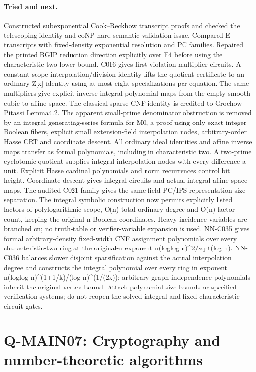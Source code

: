 \paragraph{Tried and next.} Constructed subexponential Cook--Reckhow transcript proofs and checked the telescoping identity and coNP-hard semantic validation issue. Compared E transcripts with fixed-density exponential resolution and PC families. Repaired the printed BGIP reduction direction explicitly over F4 before using the characteristic-two lower bound. C016 gives first-violation multiplier circuits. A constant-scope interpolation/division identity lifts the quotient certificate to an ordinary Z[x] identity using at most eight specializations per equation. The same multipliers give explicit inverse integral polynomial maps from the empty smooth cubic to affine space. The classical sparse-CNF identity is credited to Grochow-Pitassi Lemma4.2. The apparent small-prime denominator obstruction is removed by an integral generating-series formula for M0, a proof using only exact integer Boolean fibers, explicit small extension-field interpolation nodes, arbitrary-order Hasse CRT and coordinate descent. All ordinary ideal identities and affine inverse maps transfer as formal polynomials, including in characteristic two. A two-prime cyclotomic quotient supplies integral interpolation nodes with every difference a unit. Explicit Hasse cardinal polynomials and norm recurrences control bit height. Coordinate descent gives integral circuits and actual integral affine-space maps. The audited C021 family gives the same-field PC/IPS representation-size separation. The integral symbolic construction now permits explicitly listed factors of polylogarithmic scope, O(n) total ordinary degree and O(n) factor count, keeping the original n Boolean coordinates. Heavy incidence variables are branched on; no truth-table or verifier-variable expansion is used. NN-C035 gives formal arbitrary-density fixed-width CNF assignment polynomials over every characteristic-two ring at the original-n exponent n(loglog n)\textasciicircum{}2/sqrt(log n). NN-C036 balances slower disjoint sparsification against the actual interpolation degree and constructs the integral polynomial over every ring in exponent n(loglog n)\textasciicircum{}(1+1/k)/(log n)\textasciicircum{}(1/(2k)); arbitrary-graph independence polynomials inherit the original-vertex bound. Attack polynomial-size bounds or specified verification systems; do not reopen the solved integral and fixed-characteristic circuit gates.

\section{Q-MAIN07: Cryptography and number-theoretic algorithms}
